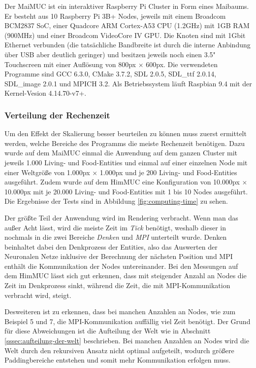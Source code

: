\documentclass[course=erap]{aspdoc}
\begin{document}
Der MaiMUC ist ein interaktiver Raspberry Pi Cluster in Form eines Maibaums. Er besteht aus 10 Raspberry Pi 3B+ Nodes, jeweils mit einem Broadcom BCM2837 SoC, einer Quadcore ARM Cortex-A53 CPU (1.2GHz) mit 1GB RAM (900MHz) und einer Broadcom VideoCore IV GPU. Die Knoten sind mit 1Gbit Ethernet verbunden (die tatsächliche Bandbreite ist durch die interne Anbindung über USB aber deutlich geringer) und besitzen jeweils noch einen 3.5" Touchscreen mit einer Auflösung von 800px $\times$ 600px. Die verwendeten Programme sind GCC 6.3.0, CMake 3.7.2, SDL 2.0.5, SDL\_ttf 2.0.14, SDL\_image 2.0.1 und MPICH 3.2. Als Betriebssystem läuft Raspbian 9.4 mit der Kernel-Vesion 4.14.70-v7+.

\subsubsection{Verteilung der Rechenzeit}
\label{sssec:computing-times}
Um den Effekt der Skalierung besser beurteilen zu können muss zuerst ermittelt werden, welche Bereiche des Programms die meiste Rechenzeit benötigen. Dazu wurde auf dem MaiMUC einmal die Anwendung auf dem ganzen Cluster mit jeweils 1.000 Living- und Food-Entities und einmal auf einer einzelnen Node mit einer Weltgröße von 1.000px $\times$ 1.000px und je 200 Living- und Food-Entities ausgeführt. Zudem wurde auf dem HimMUC eine Konfiguration von 10.000px $\times$ 10.000px mit je 20.000 Living- und Food-Entities mit 1 bis 10 Nodes ausgeführt. Die Ergebnisse der Tests sind in Abbildung \ref{fig:computing-time} zu sehen.

Der größte Teil der Anwendung wird im Rendering verbracht. Wenn man das außer Acht lässt, wird die meiste Zeit im \emph{Tick} benötigt, weshalb dieser in nochmals in die zwei Bereiche \emph{Denken} und \emph{MPI} unterteilt wurde. Denken beinhaltet dabei den Denkprozess der Entities, also das Auswerten der Neuronalen Netze inklusive der Berechnung der nächsten Position und MPI enthält die Kommunikation der Nodes untereinander. Bei den Messungen auf dem HimMUC lässt sich gut erkennen, dass mit steigender Anzahl an Nodes die Zeit im Denkprozess sinkt, während die Zeit, die mit MPI-Kommunikation verbracht wird, steigt.

Desweiteren ist zu erkennen, dass bei manchen Anzahlen an Nodes, wie zum Beispiel 5 und 7, die MPI-Kommunikation auffällig viel Zeit benötigt. Der Grund für diese Abweichungen ist die Aufteilung der Welt wie in Abschnitt \ref{sssec:aufteilung-der-welt} beschrieben. Bei manchen Anzahlen an Nodes wird die Welt durch den rekursiven Ansatz nicht optimal aufgeteilt, wodurch größere Paddingbereiche entstehen und somit mehr Kommunikation erfolgen muss.
\end{document}
